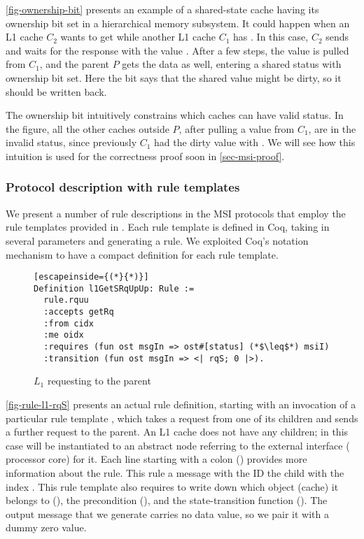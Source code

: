 \autoref{fig-ownership-bit} presents an example of a shared-state cache having its ownership bit set in a hierarchical memory subsystem.
It could happen when an L1 cache $C_2$ wants to get \stS{} while another L1 cache $C_1$ has \stM{}.
In this case, $C_2$ sends  and waits for the response with the value .
After a few steps, the value is pulled from $C_1$, and the parent $P$ gets the data as well, entering a shared status with ownership bit set.
Here the bit says that the shared value might be dirty, so it should be written back.

The ownership bit intuitively constrains which caches can have valid status.
In the figure, all the other caches outside $P$, after pulling a value from $C_1$, are in the invalid status, since previously $C_1$ had the dirty value with \stM{}.
We will see how this intuition is used for the correctness proof soon in \autoref{sec-msi-proof}.

\subsubsection{Protocol description with rule templates}

We present a number of rule descriptions in the MSI protocols that employ the rule templates provided in \hemiola{}.
Each rule template is defined in Coq, taking in several parameters and generating a rule.
We exploited Coq's notation mechanism to have a compact definition for each rule template.

\begin{figure}[h]
  \centering
\begin{lstlisting}[escapeinside={(*}{*)}]
Definition l1GetSRqUpUp: Rule :=
  rule.rquu
  :accepts getRq
  :from cidx
  :me oidx
  :requires (fun ost msgIn => ost#[status] (*$\leq$*) msiI)
  :transition (fun ost msgIn => <| rqS; 0 |>).
\end{lstlisting}
  \caption{$L_1$ requesting \stS{} to the parent}
  \label{fig-rule-l1-rqS}
\end{figure}

\autoref{fig-rule-l1-rqS} presents an actual rule definition, starting with an invocation of a particular rule template , which takes a request from one of its children and sends a further request to the parent.
An L1 cache does not have any children; in this case  will be instantiated to an abstract node referring to the external interface (\ie{} processor core) for it.
Each line starting with a colon (\slstinline{:}) provides more information about the rule.
This rule  a message with the ID   the child with the index .
This rule template also requires to write down which object (cache) it belongs to (), the precondition (), and the state-transition function ().
The output  message that we generate carries no data value, so we pair it with a dummy zero value.


